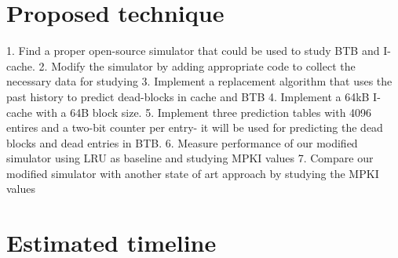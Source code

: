 \documentclass[11pt]{article}
\begin{document}
\section{Proposed technique}
\label{sec:proposed}
1.	Find a proper open-source simulator that could be used to study BTB and I-cache.
2.	Modify the simulator by adding appropriate code to collect the necessary data for studying
3.	Implement a replacement algorithm that uses the past history to predict dead-blocks in cache and BTB
4.	Implement a 64kB I-cache with a 64B block size.
5.	Implement three prediction tables with 4096 entires and a two-bit counter per entry- it will be used for predicting the dead blocks and dead entries in BTB.
6.	Measure performance of our modified simulator using LRU as baseline and studying MPKI values
7.	Compare our modified simulator with another state of art approach by studying the MPKI values


\section{Estimated timeline}
\label{sec:timeline}




{%
	
	
	}
\end{document}

